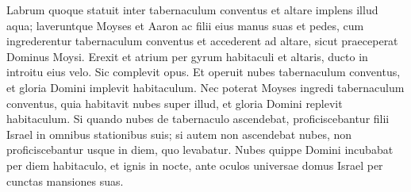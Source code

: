 \begin{biblechapter}
\verse Labrum quoque statuit inter tabernaculum conventus et altare implens illud aqua; 
\verse laveruntque Moyses et Aaron ac filii eius manus suas et pedes, 
\verse cum ingrederentur tabernaculum conventus et accederent ad altare, sicut praeceperat Dominus Moysi.  
\verse Erexit et atrium per gyrum habitaculi et altaris, ducto in introitu eius velo. Sic complevit opus. 
\verse Et operuit nubes tabernaculum conventus, et gloria Domini implevit habitaculum. 
\verse Nec poterat Moyses ingredi tabernaculum conventus, quia habitavit nubes super illud, et gloria Domini replevit habitaculum. 
\verse Si quando nubes de tabernaculo ascendebat, proficiscebantur filii Israel in omnibus stationibus suis; 
\verse si autem non ascendebat nubes, non proficiscebantur usque in diem, quo levabatur. 
\verse Nubes quippe Domini incubabat per diem habitaculo, et ignis in nocte, ante oculos universae domus Israel per cunctas mansiones suas.
\end{biblechapter}
